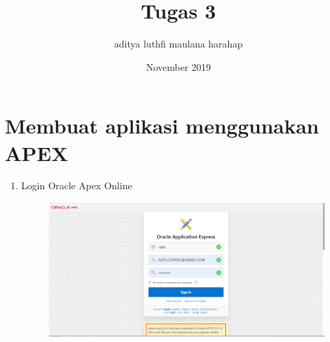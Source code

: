 \documentclass[12pt, times new roman, a4paper]{article}
\title{Tugas 3}
\author{aditya luthfi maulana harahap }
\date{November 2019}
\begin{document}
\maketitle

\section*{Membuat aplikasi menggunakan APEX}

\begin{enumerate}

\item Login Oracle Apex Online
\begin{figure} [h]
	\centering
		\includegraphics[scale=0.3]{gambar/1}
\end{figure}


\end{enumerate}
\end{document}
